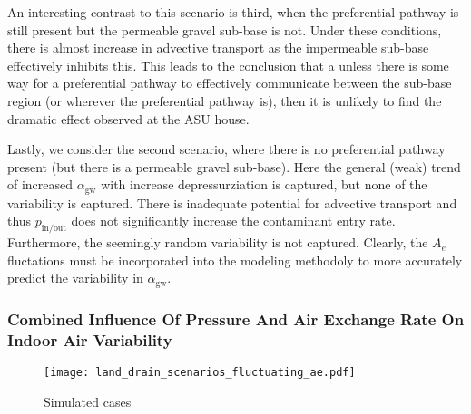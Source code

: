 \documentclass[journal=esthag,manuscript=article]{achemso}
\begin{document}
An interesting contrast to this scenario is third, when the preferential pathway is still present but the permeable gravel sub-base is not.
Under these conditions, there is almost increase in advective transport as the impermeable sub-base effectively inhibits this.
This leads to the conclusion that a unless there is some way for a preferential pathway to effectively communicate between the sub-base region (or wherever the preferential pathway is), then it is unlikely to find the dramatic effect observed at the ASU house.

Lastly, we consider the second scenario, where there is no preferential pathway present (but there is a permeable gravel sub-base).
Here the general (weak) trend of increased $\alpha_\mathrm{gw}$ with increase depressurziation is captured, but none of the variability is captured.
There is inadequate potential for advective transport and thus $p_\mathrm{in/out}$ does not significantly increase the contaminant entry rate.
Furthermore, the seemingly random variability is not captured.
Clearly, the $A_e$ fluctations must be incorporated into the modeling methodoly to more accurately predict the variability in $\alpha_\mathrm{gw}$.


\subsubsection{Combined Influence Of Pressure And Air Exchange Rate On Indoor Air Variability}

\begin{figure}[!h] %
	\centering
  \caption{Simulated cases}
  \label{fig:land_drain_scenarios_fluctuating_ae}
  \texttt{[image: land\_drain\_scenarios\_fluctuating\_ae.pdf]}
\end{figure}
\end{document}
